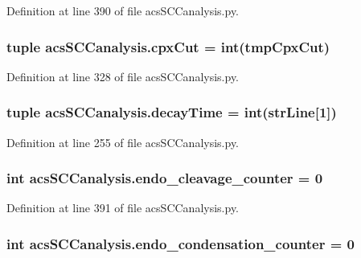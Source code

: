 Definition at line 390 of file acs\-S\-C\-Canalysis.\-py.

\hypertarget{a00096_a06673ec4592e44a89a443073b8a29011}{
\subsubsection[{cpx\-Cut}]{\setlength{\rightskip}{0pt plus 5cm}tuple acs\-S\-C\-Canalysis.\-cpx\-Cut = int(tmp\-Cpx\-Cut)}}\label{a00096_a06673ec4592e44a89a443073b8a29011}


Definition at line 328 of file acs\-S\-C\-Canalysis.\-py.

\hypertarget{a00096_a80a6d3cf3f4ccdc596054300761972a9}{
\subsubsection[{decay\-Time}]{\setlength{\rightskip}{0pt plus 5cm}tuple acs\-S\-C\-Canalysis.\-decay\-Time = int({\bf str\-Line}\mbox{[}1\mbox{]})}}\label{a00096_a80a6d3cf3f4ccdc596054300761972a9}


Definition at line 255 of file acs\-S\-C\-Canalysis.\-py.

\hypertarget{a00096_af5702a39b502da88dde8c38417a0efbd}{
\subsubsection[{endo\-\_\-cleavage\-\_\-counter}]{\setlength{\rightskip}{0pt plus 5cm}int acs\-S\-C\-Canalysis.\-endo\-\_\-cleavage\-\_\-counter = 0}}\label{a00096_af5702a39b502da88dde8c38417a0efbd}


Definition at line 391 of file acs\-S\-C\-Canalysis.\-py.

\hypertarget{a00096_a20a51ec68106a5a97fb3a72f417ca4e6}{
\subsubsection[{endo\-\_\-condensation\-\_\-counter}]{\setlength{\rightskip}{0pt plus 5cm}int acs\-S\-C\-Canalysis.\-endo\-\_\-condensation\-\_\-counter = 0}}\label{a00096_a20a51ec68106a5a97fb3a72f417ca4e6}


